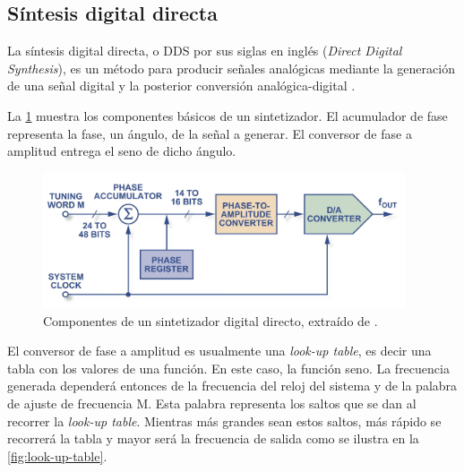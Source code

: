 \documentclass{article}
\newenvironment{standalone}{\begin{preview}}{\end{preview}}
\begin{document}
\begin{standalone}
  \subsection{Síntesis digital directa} \label{subsec:dds}

  La síntesis digital directa, o DDS por sus siglas en inglés (\textit{Direct Digital Synthesis}), es un método para producir señales analógicas mediante la generación de una señal digital y la posterior conversión analógica-digital \cite{murphy2004}.

  La \cref{fig:componentes-dds} muestra los componentes básicos de un sintetizador.
  El acumulador de fase representa la fase, un ángulo, de la señal a generar.
  El conversor de fase a amplitud entrega el seno de dicho ángulo.

  \begin{figure}[!htbp]
    \centering
    \includegraphics[width=\linewidth, height=40mm, keepaspectratio]{../images/componentes-dds.jpg}
    \caption{Componentes de un sintetizador digital directo, extraído de \cite{murphy2004}.}
    \label{fig:componentes-dds}
  \end{figure}

  El conversor de fase a amplitud es usualmente una \textit{look-up table}, es decir una tabla con los valores de una función.
  En este caso, la función seno.
  La frecuencia generada dependerá entonces de la frecuencia del reloj del sistema y de la palabra de ajuste de frecuencia M.
  Esta palabra representa los saltos que se dan al recorrer la \textit{look-up table}.
  Mientras más grandes sean estos saltos, más rápido se recorrerá la tabla y mayor será la frecuencia de salida como se ilustra en la \cref{fig:look-up-table}.


\end{standalone}
\end{document}
